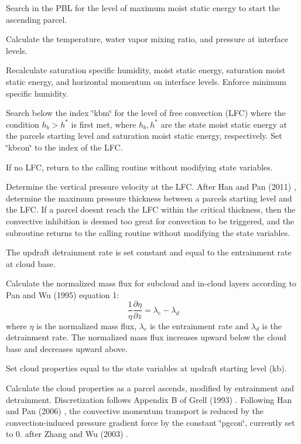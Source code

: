 \begin{DoxyItemize}
\item Search in the P\+BL for the level of maximum moist static energy to start the ascending parcel.
\item Calculate the temperature, water vapor mixing ratio, and pressure at interface levels.
\item Recalculate saturation specific humidity, moist static energy, saturation moist static energy, and horizontal momentum on interface levels. Enforce minimum specific humidity.
\item Search below the index \char`\"{}kbm\char`\"{} for the level of free convection (L\+FC) where the condition $h_b > h^*$ is first met, where $h_b, h^*$ are the state moist static energy at the parcel\textquotesingle{}s starting level and saturation moist static energy, respectively. Set \char`\"{}kbcon\char`\"{} to the index of the L\+FC.
\item If no L\+FC, return to the calling routine without modifying state variables.
\item Determine the vertical pressure velocity at the L\+FC. After Han and Pan (2011) \cite{han_and_pan_2011} , determine the maximum pressure thickness between a parcel\textquotesingle{}s starting level and the L\+FC. If a parcel doesn\textquotesingle{}t reach the L\+FC within the critical thickness, then the convective inhibition is deemed too great for convection to be triggered, and the subroutine returns to the calling routine without modifying the state variables.
\item The updraft detrainment rate is set constant and equal to the entrainment rate at cloud base.
\item Calculate the normalized mass flux for subcloud and in-\/cloud layers according to Pan and Wu (1995) \cite{pan_and_wu_1995} equation 1\+: \[ \frac{1}{\eta}\frac{\partial \eta}{\partial z} = \lambda_e - \lambda_d \] where $\eta$ is the normalized mass flux, $\lambda_e$ is the entrainment rate and $\lambda_d$ is the detrainment rate. The normalized mass flux increases upward below the cloud base and decreases upward above.
\item Set cloud properties equal to the state variables at updraft starting level (kb).
\item Calculate the cloud properties as a parcel ascends, modified by entrainment and detrainment. Discretization follows Appendix B of Grell (1993) \cite{grell_1993} . Following Han and Pan (2006) \cite{han_and_pan_2006}, the convective momentum transport is reduced by the convection-\/induced pressure gradient force by the constant \char`\"{}pgcon\char`\"{}, currently set to 0. after Zhang and Wu (2003) \cite{zhang_and_wu_2003} .

\end{DoxyItemize}

